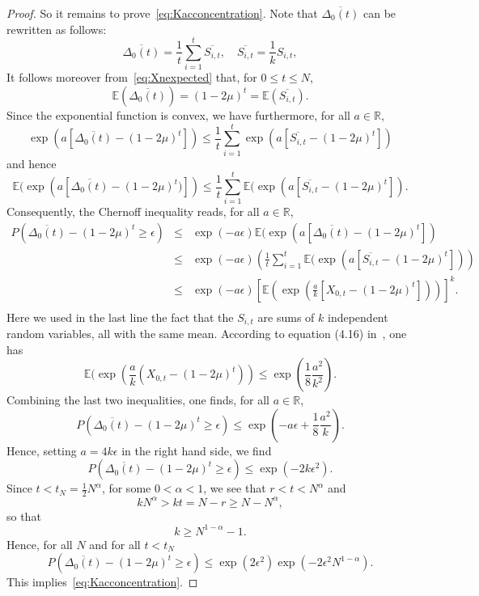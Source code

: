 \documentclass{article}
\newcommand {\E}{\mathbb{E}}
\newcommand {\R}{\mathbb{R}}
\numberwithin{equation}{section}
\begin{document}
\begin{proof}
So it remains to prove~\eqref{eq:Kacconcentration}. Note that $\overline{\Delta_0(t)}$ can be rewritten as follows:
$$
\overline{\Delta_0(t)}=\frac{1}{t}\sum_{i=1}^t \overline{S_{i,t}},\quad \overline{S_{i,t}}=\frac1{k}S_{i,t},
$$
It follows moreover from~\eqref{eq:Xnexpected} that, for $0\leq t\leq N$,
$$
\E(\overline{\Delta_0(t)})=(1-2\mu)^t=\E(\overline{S_{i,t}}).
$$
Since the exponential function is convex, we have furthermore, for all $a\in\R$,
$$
\exp(a\left[\overline{\Delta_0(t)}-(1-2\mu)^t\right])\leq \frac1{t}\sum_{i=1}^t\exp(a\left[\overline{S_{i,t}}-(1-2\mu)^t\right])
$$
and hence
\begin{equation*}
\E(\exp(a\left[\overline{\Delta_0(t)}-(1-2\mu)^t)\right])\leq \frac1{t}\sum_{i=1}^t\E(\exp(a\left[\overline{S_{i,t}}-(1-2\mu)^t\right]).
\end{equation*}
Consequently, the Chernoff inequality reads, for all $a\in\R$,
\begin{eqnarray*}%
P(\overline{\Delta_0(t)}-(1-2\mu)^t\geq \epsilon)&\leq& \exp(-a\epsilon)\E(\exp(a\left[\overline{\Delta_0(t)}-(1-2\mu)^t\right])\\
&\leq&\exp(-a\epsilon)\left(\frac1{t}\sum_{i=1}^t\E(\exp(a\left[\overline{S_{i,t}}-(1-2\mu)^t\right])\right)\\
&\leq&\exp(-a\epsilon)\left[\E(\exp(\frac{a}{k}\left[X_{0,t}-(1-2\mu)^t\right]))\right]^k.\\
\end{eqnarray*}
Here we used in the last line the fact that the $S_{i,t}$ are sums of $k$ independent random variables, all with the same mean. According to equation (4.16) in~\cite{Ho63}, one has
\begin{equation}\label{eq:hoeffdingineq}
\E(\exp(\frac{a}{k}(X_{0,t}-(1-2\mu)^t))\leq \exp(\frac18 \frac{a^2}{k^2}).
\end{equation}
Combining the last two inequalities, one finds, for all $a\in\R$,
\begin{equation}
P(\overline{\Delta_0(t)}-(1-2\mu)^t\geq \epsilon)\leq \exp(-a\epsilon+\frac18\frac{a^2}{k}).
\end{equation}
Hence, setting $a=4k\epsilon$ in the right hand side, we find
$$
P(\overline{\Delta_0(t)}-(1-2\mu)^t\geq \epsilon)\leq \exp(-2k\epsilon^2).
$$
Since $t<t_N=\frac12N^\alpha$, for some $0<\alpha<1$, we see that $r<{t}< N^\alpha$ and
$$
kN^\alpha> kt=N-r\geq N- N^\alpha,
$$
so that
$$
k\geq N^{1-\alpha}-1.
$$
Hence, for all $N$ and for all $t<t_N$
$$
P(\overline{\Delta_0(t)}-(1-2\mu)^t\geq \epsilon)\leq \exp(2\epsilon^2)\exp(-2\epsilon^2N^{1-\alpha}).
$$
This implies~\eqref{eq:Kacconcentration}.
\end{proof}
\end{document}
